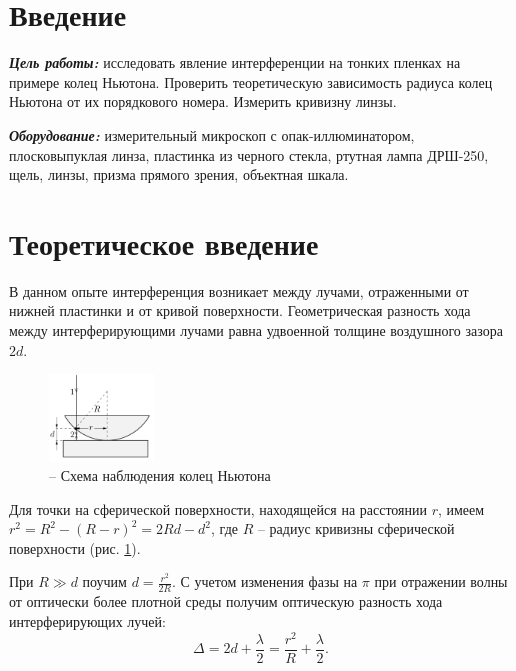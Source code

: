 \documentclass[a4paper,12pt]{article}
\theoremstyle{plain} %
\theoremstyle{definition} %
\theoremstyle{remark} %
\begin{document}
\newpage

\hypersetup{linkcolor=black}
\tableofcontents
\hypersetup{linkcolor=blue}

\newpage
\section{Введение}
\textbf{\emph{Цель работы:}} исследовать явление интерференции на тонких пленках на примере колец Ньютона. Проверить теоретическую зависимость радиуса колец Ньютона от их порядкового номера. Измерить кривизну линзы.

\textbf{\emph{Оборудование:}} измерительный микроскоп с опак-иллюминатором, плосковыпуклая линза, пластинка из черного стекла, ртутная лампа ДРШ-250, щель, линзы, призма прямого зрения, объектная шкала. 
\newpage


\section{Теоретическое введение}

В данном опыте интерференция возникает между лучами, отраженными от нижней пластинки и от кривой поверхности. Геометрическая разность хода между интерферирующими лучами равна удвоенной толщине воздушного зазора $2d$.

\begin{figure}
	\begin{center}
		\includegraphics[width=0.25\textwidth,scale=0.35]{theory_pic.png}
		\caption{-- Схема наблюдения колец Ньютона}
		\label{theory_pict}
	\end{center}
	\vspace{5mm}
\end{figure} 

Для точки на сферической поверхности, находящейся на расстоянии $r$, имеем $r^2 = R^2 -(R-r)^2 = 2Rd-d^2$, где $R$ -- радиус кривизны сферической поверхности (рис. \ref{theory_pict}).


При $R\gg d$ поучим $d=\frac{r^2}{2R}$. С учетом изменения фазы на $\pi$ при отражении волны от оптически более плотной среды получим оптическую разность хода интерферирующих лучей:
\begin{equation}
\Delta = 2d + \frac{\lambda}{2}= \frac{r^2}{R}+\frac{\lambda}{2}.
\end{equation}
\end{document}
